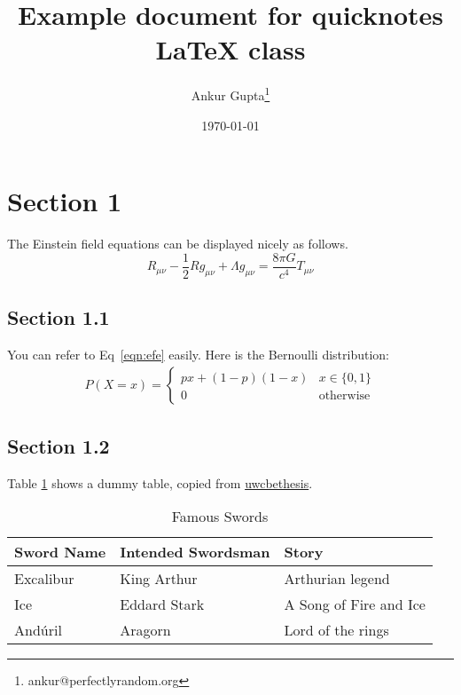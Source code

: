 \documentclass{quicknotes}
\begin{document}
\title{Example document for quicknotes \LaTeX{} class}
\author{Ankur Gupta\thanks{ankur@perfectlyrandom.org}}
\date{\today}
\maketitle
\begin{abstract}
\lipsum[3]
\end{abstract}

\section{Section 1}
The Einstein field equations\cite{einstein1916foundation} can be displayed nicely as follows.
\begin{equation}
R_{\mu\nu} - \frac{1}{2} R g_{\mu\nu} + \Lambda g_{\mu\nu} = \frac{8 \pi G}{c^4} T_{\mu\nu}
\label{eqn:efe}
\end{equation}

\subsection{Section 1.1}
You can refer to Eq~\ref{eqn:efe} easily. Here is the Bernoulli distribution:
\begin{align}
P(X = x) = \begin{cases}
px + (1-p)(1-x) & x \in \{0, 1\} \\
0 & \text{otherwise}
\end{cases} \label{eqn:bernoulli}
\end{align}

\subsection{Section 1.2}
Table \ref{tab:famousswords} shows a dummy table, copied from
\href{https://github.com/ankur-gupta/uwcbethesis}{uwcbethesis}.

\begin{table}
\caption{Famous Swords}
\label{tab:famousswords}
\centering
\begin{tabular}{lll}
\toprule
Sword Name & Intended Swordsman & Story\\
\midrule
Excalibur & King Arthur & Arthurian legend \\
Ice & Eddard Stark & A Song of Fire and Ice \\
And\'{u}ril & Aragorn & Lord of the rings \\
\bottomrule
\end{tabular}
\end{table}
\end{document}
